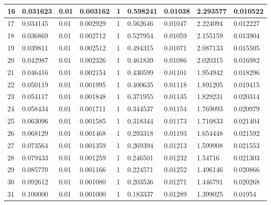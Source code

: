 \begin{table}[h!]
{\begin{tabular}{|l|l|l|l|l|l|l|l|l|}
		16 & 0.031623 &    0.01  & 0.003162 & 1               & 0.598241 & 0.01038 & 2.293577 & 0.010522 \\ \hline
		17 & 0.034145 &    0.01  & 0.002929 & 1               & 0.562646 & 0.01047 & 2.224094 & 0.012227 \\ \hline
		18 & 0.036869 &    0.01  & 0.002712 & 1               & 0.527954 & 0.01059 & 2.155159 & 0.013904 \\ \hline
		19 & 0.039811 &    0.01  & 0.002512 & 1               & 0.494315 & 0.01071 & 2.087133 & 0.015505 \\ \hline
		20 & 0.042987 &    0.01  & 0.002326 & 1               & 0.461839 & 0.01086 & 2.020315 & 0.016982 \\ \hline
		21 & 0.046416 &    0.01  & 0.002154 & 1               & 0.430599 & 0.01101 & 1.954942 & 0.018296 \\ \hline
		22 & 0.050119 &    0.01  & 0.001995 & 1               & 0.400635 & 0.01118 & 1.891205 & 0.019415 \\ \hline
		23 & 0.054117 &    0.01  & 0.001848 & 1               & 0.371955 & 0.01135 & 1.829231 & 0.020314 \\ \hline
		24 & 0.058434 &    0.01  & 0.001711 & 1               & 0.344537 & 0.01154 & 1.769093 & 0.020979 \\ \hline
		25 & 0.063096 &    0.01  & 0.001585 & 1               & 0.318344 & 0.01173 & 1.710833 & 0.021404 \\ \hline
		26 & 0.068129 &    0.01  & 0.001468 & 1               & 0.293318 & 0.01193 & 1.654448 & 0.021592 \\ \hline
		27 & 0.073564 &    0.01  & 0.001359 & 1               & 0.269394 & 0.01213 & 1.599908 & 0.021553 \\ \hline
		28 & 0.079433 &    0.01  & 0.001259 & 1               & 0.246501 & 0.01232 & 1.54716  & 0.021303 \\ \hline
		29 & 0.085770 &    0.01  & 0.001166 & 1               & 0.224571 & 0.01252 & 1.496146 & 0.020866 \\ \hline
		30 & 0.092612 &    0.01  & 0.001080 & 1               & 0.203536 & 0.01271 & 1.446791 & 0.020268 \\ \hline
		31 & 0.100000 &    0.01  & 0.001000 & 1               & 0.183337 & 0.01289 & 1.399025 & 0.01954  \\ \hline
	\end{tabular}
	}
	\label{table:results}
\end{table}